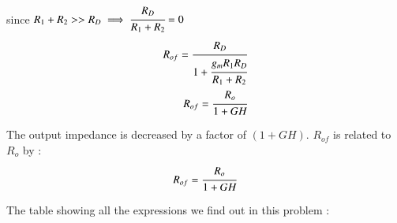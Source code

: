 \begin{enumerate}[label=\arabic*.,ref=\theenumi]
since $R_{1}+R_{2}>>R_{D} \implies \cfrac{R_{D}}{R_{1}+R_{2}} = 0$\\

\begin{align}
R_{of} = \cfrac{R_{D}}{1 + \cfrac{ g_{m}R_{1}R_{D}}{R_{1}+R_{2}}}\\
R_{of} = \cfrac{R_{o}}{1 + GH}
\end{align}

The output impedance is decreased by a factor of $(1+GH)$.
$R_{of}$ is related to $R_{o}$ by :\\
\begin{align}
R_{of} = \cfrac{R_{o}}{1 + GH}
\end{align}


The table showing all the expressions we find out in this problem :

\begin{table}[!ht]
\centering

\caption{}
\label{table}
\end{table}


\end{enumerate}

